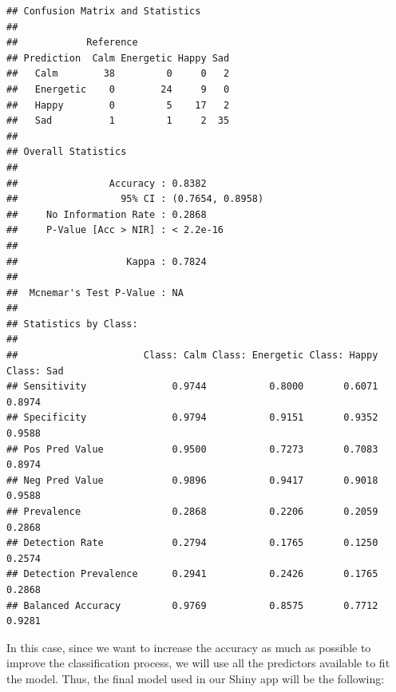 \documentclass[11pt,]{article}
\newenvironment{Shaded}{\begin{snugshade}}{\end{snugshade}}
\newcommand{\AttributeTok}[1]{\textcolor[rgb]{0.13,0.29,0.53}{#1}}
\newcommand{\CommentTok}[1]{\textcolor[rgb]{0.56,0.35,0.01}{\textit{#1}}}
\newcommand{\ConstantTok}[1]{\textcolor[rgb]{0.56,0.35,0.01}{#1}}
\newcommand{\DecValTok}[1]{\textcolor[rgb]{0.00,0.00,0.81}{#1}}
\newcommand{\FunctionTok}[1]{\textcolor[rgb]{0.13,0.29,0.53}{\textbf{#1}}}
\newcommand{\NormalTok}[1]{#1}
\newcommand{\OtherTok}[1]{\textcolor[rgb]{0.56,0.35,0.01}{#1}}
\newcommand{\SpecialCharTok}[1]{\textcolor[rgb]{0.81,0.36,0.00}{\textbf{#1}}}
\newcommand{\StringTok}[1]{\textcolor[rgb]{0.31,0.60,0.02}{#1}}
\begin{document}
\begin{verbatim}
## Confusion Matrix and Statistics
## 
##            Reference
## Prediction  Calm Energetic Happy Sad
##   Calm        38         0     0   2
##   Energetic    0        24     9   0
##   Happy        0         5    17   2
##   Sad          1         1     2  35
## 
## Overall Statistics
##                                           
##                Accuracy : 0.8382          
##                  95% CI : (0.7654, 0.8958)
##     No Information Rate : 0.2868          
##     P-Value [Acc > NIR] : < 2.2e-16       
##                                           
##                   Kappa : 0.7824          
##                                           
##  Mcnemar's Test P-Value : NA              
## 
## Statistics by Class:
## 
##                      Class: Calm Class: Energetic Class: Happy Class: Sad
## Sensitivity               0.9744           0.8000       0.6071     0.8974
## Specificity               0.9794           0.9151       0.9352     0.9588
## Pos Pred Value            0.9500           0.7273       0.7083     0.8974
## Neg Pred Value            0.9896           0.9417       0.9018     0.9588
## Prevalence                0.2868           0.2206       0.2059     0.2868
## Detection Rate            0.2794           0.1765       0.1250     0.2574
## Detection Prevalence      0.2941           0.2426       0.1765     0.2868
## Balanced Accuracy         0.9769           0.8575       0.7712     0.9281
\end{verbatim}

In this case, since we want to increase the accuracy as much as possible
to improve the classification process, we will use all the predictors
available to fit the model. Thus, the final model used in our Shiny app
will be the following:

\begin{Shaded}
\end{Shaded}
\end{document}
